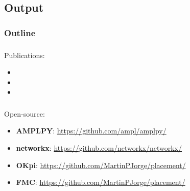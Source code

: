 \documentclass[aspectratio=169]{beamer}
\begin{document}
\subsection{Output}
\begin{frame}
    \frametitle{Outline}
    \tableofcontents[subsectionstyle=show/shaded/hide,sectionstyle=show/shaded]
\end{frame}


\begin{frame}
    \frametitle{\secname}
    \framesubtitle{\subsecname}
    Publications:
    \begin{itemize}
        \item {}
        \item {}
        \item {}
    \end{itemize}
\end{frame}


\begin{frame}
    \frametitle{\secname}
    \framesubtitle{\subsecname}
    Open-source:
    \begin{itemize}
        \item \textbf{AMPLPY}: \url{https://github.com/ampl/amplpy/}
        \item \textbf{networkx}: \url{https://github.com/networkx/networkx/}
        \item \textbf{OKpi}: \url{https://github.com/MartinPJorge/placement/}
        \item \textbf{FMC}: \url{https://github.com/MartinPJorge/placement/}
    \end{itemize}
\end{frame}
\end{document}
